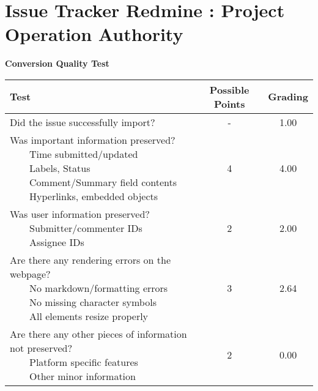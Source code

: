 \documentclass{article}
\newcommand{\tabitem}{~~\llap{\textbullet}~~}
\begin{document}
\\\section{Issue Tracker Redmine : Project Operation Authority}
\textbf{Conversion Quality Test}\\
\begin{adjustbox}{center}
	\renewcommand{\arraystretch}{1.5}
	\begin{tabular}{ p{6cm} | c | c }
		Test & Possible Points & Grading \\ \hline
		Did the issue successfully import? & - & 1.00 \\
		\hline
		\makecell[l]{
			Was important information preserved? \\
			\tabitem Time submitted/updated \\
			\tabitem Labels, Status \\
			\tabitem Comment/Summary field contents \\
			\tabitem Hyperlinks, embedded objects}
		& 4 & 4.00 \\
		\hline
		\makecell[l]{
			Was user information preserved? \\
			\tabitem Submitter/commenter IDs \\
			\tabitem Assignee IDs
		} & 2 & 2.00 \\
		\hline
		\makecell[{{p{6cm}}}]{
			Are there any rendering errors on the webpage? \\
			\tabitem No markdown/formatting errors \\
			\tabitem No missing character symbols \\
			\tabitem All elements resize properly
		} & 3 & 2.64 \\
		\hline
		\makecell[{{p{6cm}}}]{
			Are there any other pieces of information not preserved? \\
			\tabitem Platform specific features \\
			\tabitem Other minor information
		} & 2 & 0.00 \\
	\end{tabular}
\end{adjustbox}
\\
\end{document}
